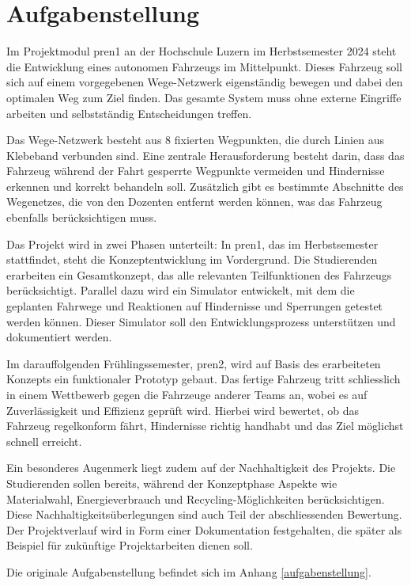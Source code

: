 \documentclass[../main.tex]{subfiles}
\begin{document}
\newpage
\section{Aufgabenstellung}
Im Projektmodul \acrfull{pren1} an der Hochschule Luzern im Herbstsemester 2024 steht die Entwicklung eines autonomen Fahrzeugs im Mittelpunkt. Dieses Fahrzeug soll sich auf einem vorgegebenen Wege-Netzwerk eigenständig bewegen und dabei den optimalen Weg zum Ziel finden. Das gesamte System muss ohne externe Eingriffe arbeiten und selbstständig Entscheidungen treffen. 

Das Wege-Netzwerk besteht aus 8 fixierten Wegpunkten, die durch Linien aus Klebeband verbunden sind. Eine zentrale Herausforderung besteht darin, dass das Fahrzeug während der Fahrt gesperrte Wegpunkte vermeiden und Hindernisse erkennen und korrekt behandeln soll. Zusätzlich gibt es bestimmte Abschnitte des Wegenetzes, die von den Dozenten entfernt werden können, was das Fahrzeug ebenfalls berücksichtigen muss. 

Das Projekt wird in zwei Phasen unterteilt: In \acrshort{pren1}, das im Herbstsemester stattfindet, steht die Konzeptentwicklung im Vordergrund. Die Studierenden erarbeiten ein Gesamtkonzept, das alle relevanten Teilfunktionen des Fahrzeugs berücksichtigt. Parallel dazu wird ein Simulator entwickelt, mit dem die geplanten Fahrwege und Reaktionen auf Hindernisse und Sperrungen getestet werden können. Dieser Simulator soll den Entwicklungsprozess unterstützen und dokumentiert werden. 

Im darauffolgenden Frühlingssemester, \acrshort{pren2}, wird auf Basis des erarbeiteten Konzepts ein funktionaler Prototyp gebaut. Das fertige Fahrzeug tritt schliesslich in einem Wettbewerb gegen die Fahrzeuge anderer Teams an, wobei es auf Zuverlässigkeit und Effizienz geprüft wird. Hierbei wird bewertet, ob das Fahrzeug regelkonform fährt, Hindernisse richtig handhabt und das Ziel möglichst schnell erreicht. 

Ein besonderes Augenmerk liegt zudem auf der Nachhaltigkeit des Projekts. Die Studierenden sollen bereits, während der Konzeptphase Aspekte wie Materialwahl, Energieverbrauch und Recycling-Möglichkeiten berücksichtigen. Diese Nachhaltigkeitsüberlegungen sind auch Teil der abschliessenden Bewertung. Der Projektverlauf wird in Form einer Dokumentation festgehalten, die später als Beispiel für zukünftige Projektarbeiten dienen soll.

Die originale Aufgabenstellung befindet sich im Anhang \ref{aufgabenstellung}.
\end{document}
